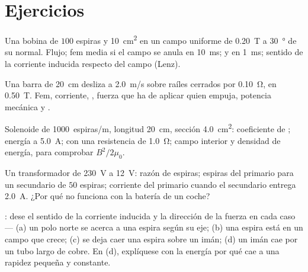 \section{Ejercicios}

\begin{exercise}[$\star$]\label{exo:b1:induction:1}
Una bobina de $100$ espiras y \qty{10}{cm^2} en un campo uniforme de
\qty{0.20}{T} a \qty{30}{\degree} de su normal. Flujo; fem media si el
campo se anula en \qty{10}{ms}; y en \qty{1}{ms}; sentido de la corriente
inducida respecto del campo (Lenz).
\end{exercise}

\begin{exercise}[$\star$]\label{exo:b1:induction:2}
Una barra de \qty{20}{cm} desliza a \qty{2.0}{m/s} sobre raíles cerrados
por \qty{0.10}{\ohm}, en \qty{0.50}{T}. Fem, corriente, ,
fuerza que ha de aplicar quien empuja, potencia mecánica y .
\end{exercise}

\begin{exercise}[$\star$]\label{exo:b1:induction:3}
Solenoide de \qty{1000}{espiras/m}, longitud \qty{20}{cm}, sección \qty{4.0}{cm^2}:
coeficiente de ; energía a \qty{5.0}{A}; 
con una resistencia de \qty{1.0}{\ohm}; campo interior y densidad de
energía, para comprobar $B^2/2\mu_0$.
\end{exercise}

\begin{exercise}[$\star$]\label{exo:b1:induction:4}
Un transformador de \qty{230}{V} a \qty{12}{V}: razón de espiras; espiras
del primario para un secundario de $50$ espiras; corriente del primario
cuando el secundario entrega \qty{2.0}{A}. ¿Por qué no funciona con la
batería de un coche?
\end{exercise}

\begin{exercise}[$\star\star$]\label{exo:b1:induction:5}
: dese el sentido de la corriente inducida y la dirección de
la fuerza en cada caso --- (a) un polo norte se acerca a una espira según
su eje; (b) una espira está en un campo que crece; (c) se deja caer una
espira sobre un imán; (d) un imán cae por un tubo largo de cobre. En (d),
explíquese con la energía por qué cae a una rapidez pequeña y constante.
\end{exercise}

